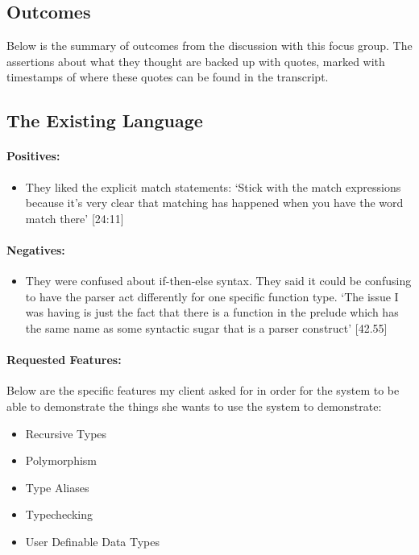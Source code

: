 \subsection{Outcomes}
Below is the summary of outcomes from the discussion with this focus group. The assertions about what they thought are backed up with quotes, marked with timestamps of where these quotes can be found in the transcript. 

\subsection{The Existing Language}
\paragraph{Positives:}
\begin{itemize}
    \item They liked the explicit match statements: `Stick with the match expressions because it's very clear that matching has happened when you have the word match there' [24:11]
\end{itemize}

\paragraph{Negatives:}
\begin{itemize}
    \item \label{ref:afg_ite} They were confused about if-then-else syntax. They said it could be confusing to have the parser act differently for one specific function type. `The issue I was having is just the fact that there is a function in the prelude which has the same name as some syntactic sugar that is a parser construct' [42.55]
\end{itemize}

\paragraph{Requested Features:}
Below are the specific features my client asked for in order for the system to be able to demonstrate the things she wants to use the system to demonstrate:
\begin{itemize}
    \item Recursive Types
    \item Polymorphism
    \item Type Aliases
    \item Typechecking
    \item User Definable Data Types
\end{itemize}

